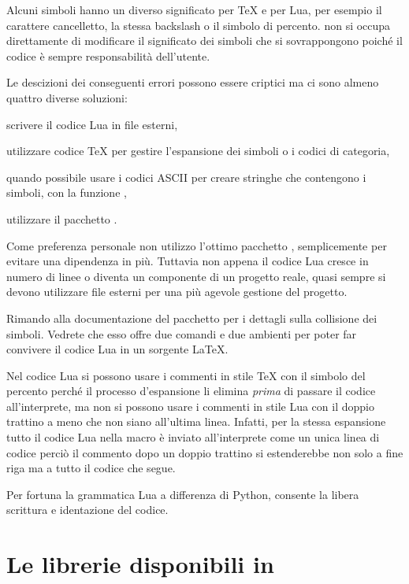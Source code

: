 Alcuni simboli hanno un diverso significato per \TeX{} e per Lua, per esempio il
carattere cancelletto, la stessa backslash o il simbolo di percento. \LuaTeX{}
non si occupa direttamente di modificare il significato dei simboli che si
sovrappongono poiché il codice è sempre responsabilità dell'utente.

Le descizioni dei conseguenti errori possono essere criptici ma ci sono almeno
quattro diverse soluzioni:
\begin{compactitemize}
\item scrivere il codice Lua in file esterni,
\item utilizzare codice \TeX{} per gestire l'espansione dei simboli o i codici
di categoria,
\item quando possibile usare i codici ASCII per creare stringhe che contengono
i simboli, con la funzione ,
\item utilizzare il pacchetto .
\end{compactitemize}

Come preferenza personale non utilizzo l'ottimo pacchetto ,
semplicemente per evitare una dipendenza in più. Tuttavia non appena il codice
Lua cresce in numero di linee o diventa un componente di un progetto reale,
quasi sempre si devono utilizzare file esterni per una più agevole gestione del
progetto.

Rimando alla documentazione del pacchetto  per i dettagli sulla
collisione dei simboli. Vedrete che esso offre due comandi e due ambienti per
poter far convivere il codice Lua in un sorgente \LaTeX.

Nel codice Lua si possono usare i commenti in stile \TeX{} con il simbolo del
percento perché il processo d'espansione li elimina \emph{prima} di passare il
codice all'interprete, ma non si possono usare i commenti in stile Lua con il
doppio trattino a meno che non siano all'ultima linea. Infatti, per la stessa
espansione tutto il codice Lua nella macro  è inviato
all'interprete come un unica linea di codice perciò il commento dopo un doppio
trattino si estenderebbe non solo a fine riga ma a tutto il codice che segue.

Per fortuna la grammatica Lua a differenza di Python, consente la libera
scrittura e identazione del codice.


\section{Le librerie disponibili in \LuaTeX}

